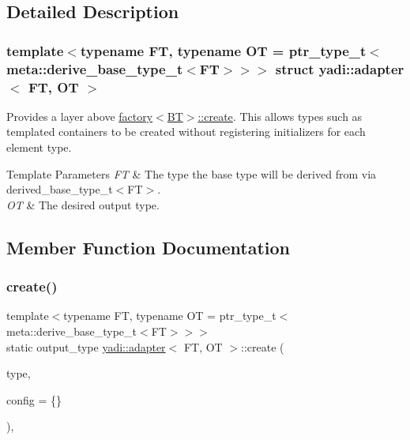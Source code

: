 \subsection{Detailed Description}
\subsubsection*{template$<$typename FT, typename OT = ptr\+\_\+type\+\_\+t$<$meta\+::derive\+\_\+base\+\_\+type\+\_\+t$<$\+F\+T$>$$>$$>$\newline
struct yadi\+::adapter$<$ F\+T, O\+T $>$}

Provides a layer above \hyperlink{structyadi_1_1factory_a600474900d2c6fa5d09935a641298bd5}{factory$<$\+B\+T$>$\+::create}. This allows types such as templated containers to be created without registering initializers for each element type. 


\begin{DoxyTemplParams}{Template Parameters}
{\em FT} & The type the base type will be derived from via derived\+\_\+base\+\_\+type\+\_\+t$<$\+F\+T$>$. \\
\hline
{\em OT} & The desired output type. \\
\hline
\end{DoxyTemplParams}


\subsection{Member Function Documentation}
\mbox{\label{structyadi_1_1adapter_aaa3da42043e4278ad2d499f60e446602}} 
\subsubsection{\texorpdfstring{create()}{create()}}
{\footnotesize\ttfamily template$<$typename FT, typename OT = ptr\+\_\+type\+\_\+t$<$meta\+::derive\+\_\+base\+\_\+type\+\_\+t$<$\+F\+T$>$$>$$>$ \\
static output\+\_\+type \hyperlink{structyadi_1_1adapter}{yadi\+::adapter}$<$ FT, OT $>$\+::create (\begin{DoxyParamCaption}\item[{std\+::string const \&}]{type,  }\item[{Y\+A\+M\+L\+::\+Node const \&}]{config = {\ttfamily \{\}} }\end{DoxyParamCaption})\hspace{0.3cm}{\ttfamily [inline]}, {\ttfamily [static]}}



